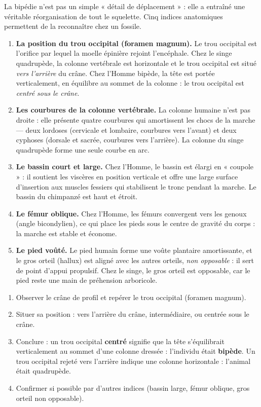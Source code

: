 \documentclass[11pt]{article}
\newcommand{\cle}[1]{{\popxbold\color{popdark}#1}}
\begin{document}
La bipédie n'est pas un simple « détail de déplacement » : elle a entraîné une véritable réorganisation de tout le squelette. Cinq indices anatomiques permettent de la reconnaître chez un fossile.

\begin{enumerate}
\item \textbf{La position du trou occipital (foramen magnum).} Le trou occipital est l'orifice par lequel la moelle épinière rejoint l'encéphale. Chez le singe quadrupède, la colonne vertébrale est horizontale et le trou occipital est situé \emph{vers l'arrière} du crâne. Chez l'Homme bipède, la tête est portée verticalement, en équilibre au sommet de la colonne : le trou occipital est \emph{centré sous le crâne}.
\item \textbf{Les courbures de la colonne vertébrale.} La colonne humaine n'est pas droite : elle présente quatre courbures qui amortissent les chocs de la marche — deux \cle{lordoses} (cervicale et lombaire, courbures vers l'avant) et deux \cle{cyphoses} (dorsale et sacrée, courbures vers l'arrière). La colonne du singe quadrupède forme une seule courbe en arc.
\item \textbf{Le bassin court et large.} Chez l'Homme, le bassin est élargi en « coupole » : il soutient les viscères en position verticale et offre une large surface d'insertion aux muscles fessiers qui stabilisent le tronc pendant la marche. Le bassin du chimpanzé est haut et étroit.
\item \textbf{Le fémur oblique.} Chez l'Homme, les fémurs convergent vers les genoux (angle bicondylien), ce qui place les pieds sous le centre de gravité du corps : la marche est stable et économe.
\item \textbf{Le pied voûté.} Le pied humain forme une voûte plantaire amortissante, et le \cle{gros orteil} (hallux) est aligné avec les autres orteils, \emph{non opposable} : il sert de point d'appui propulsif. Chez le singe, le gros orteil est opposable, car le pied reste une main de préhension arboricole.
\end{enumerate}

\begin{methode}
\begin{enumerate}
\item Observer le crâne de profil et repérer le trou occipital (foramen magnum).
\item Situer sa position : vers l'arrière du crâne, intermédiaire, ou centrée sous le crâne.
\item Conclure : un trou occipital \textbf{centré} signifie que la tête s'équilibrait verticalement au sommet d'une colonne dressée : l'individu était \textbf{bipède}. Un trou occipital rejeté vers l'arrière indique une colonne horizontale : l'animal était quadrupède.
\item Confirmer si possible par d'autres indices (bassin large, fémur oblique, gros orteil non opposable).
\end{enumerate}
\end{methode}
\end{document}
